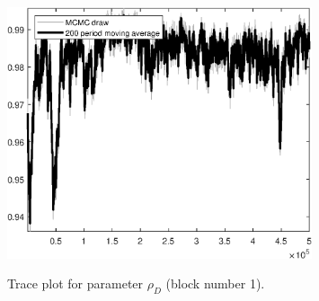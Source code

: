 \begin{figure}[H]
\centering
  \includegraphics[width=0.8\textwidth]{BRS_growth_ext_fd/graphs/TracePlot_rho_D_blck_1}\\
    \caption{Trace plot for parameter ${\rho_D}$ (block number 1).}
\end{figure}
